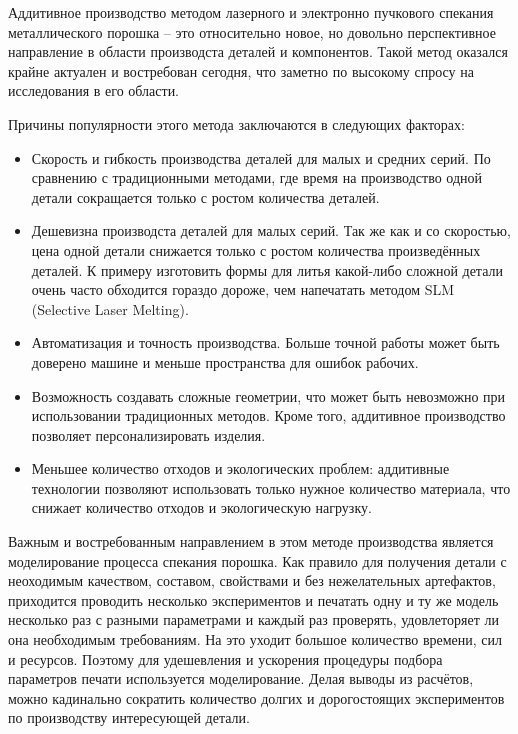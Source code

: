 
Аддитивное производство методом лазерного и электронно пучкового спекания 
металлического порошка -- это относительно новое, но довольно перспективное 
направление в области производста деталей и компонентов. Такой метод оказался
крайне актуален и востребован сегодня, что заметно по высокому спросу на 
исследования в его области.

Причины популярности этого метода заключаются в следующих факторах:

\begin{itemize}
    \item Скорость и гибкость производства деталей для малых и средних серий. По сравнению с традиционными методами, где время на производство одной детали сокращается только с ростом количества деталей. 
    \item Дешевизна производста деталей для малых серий. Так же как и со скоростью, цена одной детали снижается только с ростом количества произведённых деталей. К примеру изготовить формы для литья какой-либо сложной детали очень часто обходится гораздо дороже, чем напечатать методом SLM (Selective Laser Melting).
    \item Автоматизация и точность производства. Больше точной работы может быть доверено машине и меньше пространства для ошибок рабочих.
    \item Возможность создавать сложные геометрии, что может быть невозможно при использовании традиционных методов. Кроме того, аддитивное производство позволяет персонализировать изделия.
    \item Меньшее количество отходов и экологических проблем: аддитивные технологии позволяют использовать только нужное количество материала, что снижает количество отходов и экологическую нагрузку.\\
\end{itemize}

Важным и востребованным направлением в этом методе производства является моделирование процесса спекания порошка. Как правило для получения детали с неоходимым качеством, составом, свойствами и без нежелательных артефактов, приходится проводить несколько экспериментов и печатать одну и ту же модель несколько раз с разными параметрами и каждый раз проверять, удовлеторяет ли она необходимым требованиям. На это уходит большое количество времени, сил и ресурсов. Поэтому для удешевления и ускорения процедуры подбора параметров печати используется моделирование. Делая выводы из расчётов, можно кадинально сократить количество долгих и дорогостоящих экспериментов по производству интересующей детали.

